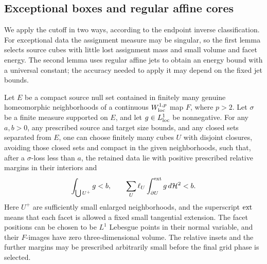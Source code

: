 \subsection{Exceptional boxes and regular affine cores}

We apply the cutoff in two ways, according to the endpoint inverse
classification.  For exceptional data the assignment measure may be
singular, so the first lemma selects source cubes with little lost
assignment mass and small volume and facet energy.  The second lemma
uses regular affine jets to obtain an energy bound with a universal
constant; the accuracy needed to apply it may depend on the fixed jet
bounds.

\begin{lemma}\label{hp:exceptional-boxes}
Let $E$ be a compact source null set contained in finitely many genuine
homeomorphic neighborhoods of a continuous $W^{1,p}_{\rm loc}$ map
$F$, where $p>2$.  Let $\sigma$ be a finite measure supported on $E$,
and let $g\in L^1_{\rm loc}$ be nonnegative.  For any $a,b>0$, any
prescribed source and target size bounds, and any closed sets separated
from $E$, one can choose finitely many cubes $U$ with disjoint closures,
avoiding those closed sets and compact in the given neighborhoods,
such that, after a $\sigma$-loss less than $a$, the retained data lie
with positive prescribed relative margins in their interiors and
\begin{equation}\label{hp:exceptional-cube-budget}
 \int_{\bigcup U^+}g< b,
 \qquad
 \sum_U\ell_U\int_{\partial U}^{\rm ext}g\,d\mathcal H^2<b.
\end{equation}
Here $U^+$ are sufficiently small enlarged neighborhoods, and the
superscript $\rm ext$ means that each facet is allowed a fixed small
tangential extension.  The facet positions can be chosen to be
$L^1$ Lebesgue points in their normal variable, and their $F$-images
have zero three-dimensional volume.  The relative insets and the
further margins may be prescribed arbitrarily small before the final
grid phase is selected.
\end{lemma}

